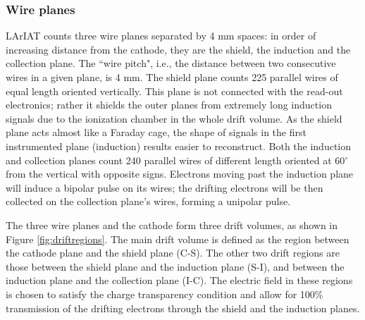 \subsubsection{Wire planes}
LArIAT counts three wire planes separated by 4 mm spaces: in order of increasing distance from the cathode, they are the shield, the induction and the collection plane. The ``wire pitch", i.e., the distance between two consecutive wires in a given plane, is 4 mm.  The shield plane counts 225 parallel wires of equal length oriented vertically. This plane is not connected with the read-out electronics; rather it shields the outer planes from extremely long induction signals due to the ionization chamber in the whole drift volume. As the shield plane acts almost like a Faraday cage, the shape of signals in the first instrumented plane (induction)  results easier to reconstruct.  Both the induction and collection planes count 240 parallel wires of different length oriented at 60$^\circ$ from the vertical with opposite signs.
Electrons moving past the induction plane will induce a bipolar pulse on its wires; the drifting electrons will be then collected on the collection plane's wires, forming a unipolar pulse. 

The three wire planes and the cathode form three drift volumes, as shown in Figure \ref{fig:driftregions}. 
The main drift volume is defined as the region between the cathode plane and the shield plane (C-S). The other two drift regions are those between the shield plane and the induction plane (S-I), and between the induction plane and the collection plane (I-C). The electric field in these regions is chosen to satisfy the charge transparency condition and allow for 100$\%$ transmission of the drifting electrons through the shield and the induction planes. 

